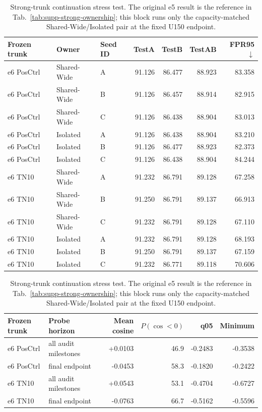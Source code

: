 \begin{table}[t]
\centering
\caption{Strong-trunk continuation stress test.  The original e5 result is the
reference in Tab.~\ref{tab:supp-strong-ownership}; this block runs only the
capacity-matched Shared-Wide/Isolated pair at the fixed U150 endpoint.}
\label{tab:supp-strong-e6-ownership}
\scriptsize
\setlength{\tabcolsep}{4pt}
\begin{tabular}{lllrrrr}
\toprule
Frozen trunk & Owner & Seed ID & TestA & TestB & TestAB & FPR95$\downarrow$\\
\midrule
e6 PosCtrl & Shared-Wide & A & 91.126 & 86.477 & 88.923 & 83.358 \\
e6 PosCtrl & Shared-Wide & B & 91.126 & 86.457 & 88.914 & 82.915 \\
e6 PosCtrl & Shared-Wide & C & 91.126 & 86.438 & 88.904 & 83.013 \\
e6 PosCtrl & Isolated & A & 91.126 & 86.438 & 88.904 & 83.210 \\
e6 PosCtrl & Isolated & B & 91.126 & 86.477 & 88.923 & 82.373 \\
e6 PosCtrl & Isolated & C & 91.126 & 86.438 & 88.904 & 84.244 \\
e6 TN10 & Shared-Wide & A & 91.232 & 86.791 & 89.128 & 67.258 \\
e6 TN10 & Shared-Wide & B & 91.250 & 86.791 & 89.137 & 66.913 \\
e6 TN10 & Shared-Wide & C & 91.232 & 86.791 & 89.128 & 67.110 \\
e6 TN10 & Isolated & A & 91.232 & 86.791 & 89.128 & 68.193 \\
e6 TN10 & Isolated & B & 91.250 & 86.791 & 89.137 & 67.159 \\
e6 TN10 & Isolated & C & 91.232 & 86.771 & 89.118 & 70.606 \\
\bottomrule
\end{tabular}
\par\medskip
\begin{tabular}{llrrrr}
\toprule
Frozen trunk & Probe horizon & Mean cosine & $P(\cos<0)$ & q05 & Minimum\\
\midrule
e6 PosCtrl & all audit milestones & +0.0103 & 46.9 & -0.2483 & -0.3538 \\
e6 PosCtrl & final endpoint & -0.0453 & 58.3 & -0.1820 & -0.2422 \\
e6 TN10 & all audit milestones & +0.0543 & 53.1 & -0.4704 & -0.6727 \\
e6 TN10 & final endpoint & -0.0763 & 66.7 & -0.5162 & -0.5596 \\

\end{tabular}
\end{table}
